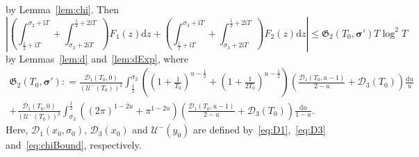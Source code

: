 \documentclass[a4paper,reqno]{amsart}
\theoremstyle{definition}
\newcommand{\de}[0]{\mathrel{\mathop:}=}
\newcommand{\ie}[0]{\mathrm{i}}
\newcommand{\dif}[1]{\mathrm{d}#1}
\begin{document}
by Lemma~\ref{lem:chi}. Then
\begin{equation}
\label{eq:F1F2res}
\left|\left(\int_{\frac{1}{2}+\ie T}^{\sigma_2+\ie T}+\int_{\sigma_2+2\ie T}^{\frac{1}{2}+2\ie T}\right)F_1(z)\dif{z} + \left(\int_{\frac{1}{2}+\ie T}^{\sigma_3+\ie T}+\int_{\sigma_3+2\ie T}^{\frac{1}{2}+2\ie T}\right)F_{2}(z)\dif{z}\right| \leq \mathfrak{G}_2\left(T_0,\bm{\sigma'}\right)T\log^{2}{T}
\end{equation}
by Lemmas~\ref{lem:d} and~\ref{lem:dExp}, where
\begin{multline}
\label{eq:fG2}
\mathfrak{G}_2\left(T_0,\bm{\sigma'}\right) \de \frac{\mathcal{D}_1(T_0,0)}{\left(\mathcal{U}^{-}(T_0)\right)^{2}}\int_{\frac{1}{2}}^{\sigma_2}\left(\left(1+\frac{1}{T_0}\right)^{u-\frac{1}{2}}+\left(1+\frac{1}{2T_0}\right)^{u-\frac{1}{2}}\right)\left(\frac{\mathcal{D}_1(T_0,u-1)}{2-u}+\mathcal{D}_{3}(T_0)\right)\frac{\dif{u}}{u} \\
+ \frac{\mathcal{D}_1(T_0,0)}{\left(\mathcal{U}^{-}(T_0)\right)^{2}}\int_{\sigma_3}^{\frac{1}{2}}\left((2\pi)^{1-2u}+\pi^{1-2u}\right)\left(\frac{\mathcal{D}_1(T_0,u-1)}{2-u}+\mathcal{D}_{3}(T_0)\right)\frac{\dif{u}}{1-u}.
\end{multline}
Here, $\mathcal{D}_{1}(x_0,\sigma_0)$, $\mathcal{D}_{3}(x_0)$ and $\mathcal{U}^{-}(y_0)$ are defined by~\eqref{eq:D1},~\eqref{eq:D3} and~\eqref{eq:chiBound}, respectively.
\end{document}
